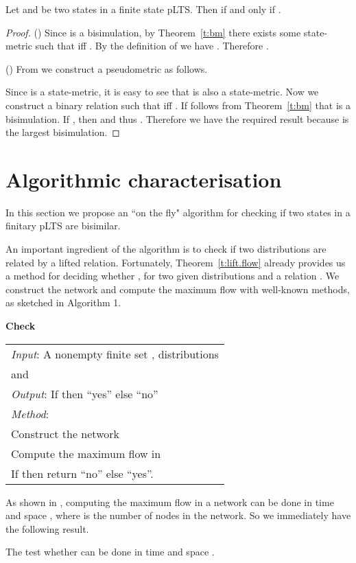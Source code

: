 \documentclass{article}
\def\squareforqed{\hbox{\rlap{}}}
\def\qed{\ifmmode\squareforqed\else{\unskip\nobreak\hfil
\penalty50\hskip1em\null\nobreak\hfil\squareforqed
\parfillskip=0pt\finalhyphendemerits=0\endgraf}\fi}
\begin{document}
\begin{corollary}\label{c:bimx}
Let  and  be two states in a finite state pLTS. Then  if and only if .
\end{corollary}
\begin{proof}
() Since  is a bisimulation, by
Theorem~\ref{t:bm} there exists some state-metric  such that
 iff . By the definition of  we
have . Therefore .

() From  we construct a pseudometric  as
follows.

Since  is a state-metric, it is easy to see that  is
also a state-metric. Now we construct a binary relation  such
that  iff . If follows from
Theorem~\ref{t:bm} that  is a bisimulation. If , then  and thus . Therefore we have
the required result  because  is the largest
bisimulation.
\end{proof}




\section{Algorithmic characterisation}\label{s:algo}
In this section we propose an ``on the fly" algorithm for checking
if two states in a finitary pLTS are  bisimilar.

An important ingredient of the algorithm is to check if two
distributions are related by a lifted relation. Fortunately,
Theorem~\ref{t:lift.flow} already provides us a method for deciding
whether , for two given distributions
 and a relation . We construct the network
 and compute the maximum flow with
well-known methods, as sketched in
Algorithm 1.

\begin{algorithm}
\caption{\textbf{Check}}
\begin{tabular}{l}
\emph{Input}: A nonempty finite set , distributions\\
\qquad 
and \\
\emph{Output}: If  then ``yes'' else ``no''\\
\emph{Method}:\\
\qquad Construct the network \\
\qquad Compute the maximum flow  in \\
\qquad If  then return ``no'' else ``yes''.
\end{tabular}
\end{algorithm}
As shown in \cite{CHM90}, computing the maximum flow in a network
can be done in time  and space , where  is
the number of nodes in the network. So we immediately have the
following result.
\begin{lemma}\label{l:check.lift}
The test whether  can be done in time  and space . \hfill\qed
\end{lemma}
\end{document}
